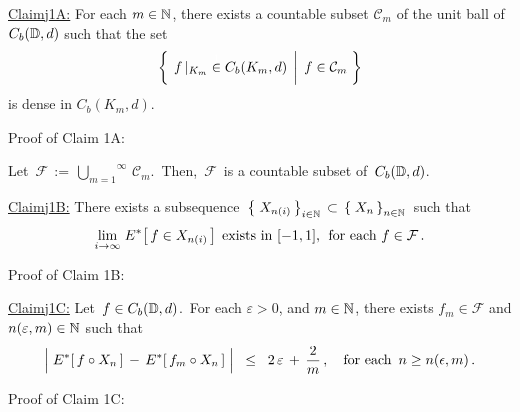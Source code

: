 \vskip 0.8cm
\begin{center}\begin{minipage}{6.5in}
\underline{Claim{{\color{white}j}}1A:}\;\;
For each $m \in \mathbb{N}$, there exists a countable subset $\mathcal{C}_{m}$
of the unit ball of $C_{b}(\mathbb{D},d)$ such that the set
\begin{equation*}
\left\{\;
	\left.
	f\,\vert_{K_{m}} \overset{{\color{white}1}}{\in} C_{b}(K_{m},d)
	\,\;\right\vert\;
	f \in \mathcal{C}_{m}
\;\right\}
\end{equation*}
is dense in $C_{b}(K_{m},d)$.
\end{minipage}\end{center}
Proof of Claim 1A:\;\;

\vskip 0.5cm
\noindent
Let \,$\mathcal{F} \,:=\, \overset{\infty}{\underset{m=1}{\bigcup}}\,\mathcal{C}_{m}$.\,
Then, \,$\mathcal{F}$\, is a countable subset of \,$C_{b}(\mathbb{D},d)$.\,

\vskip 0.8cm
\begin{center}\begin{minipage}{6.5in}
\underline{Claim{{\color{white}j}}1B:}\;\;
There exists a subsequence
\,$\left\{\;X_{n(i)}\,\right\}_{i\in\mathbb{N}} \,\subset\, \left\{\;X_{n}\,\right\}_{n\in\mathbb{N}}$\,
such that %
\begin{equation*}
\underset{i\rightarrow\infty}{\lim}\; E^{*}\!\left[\,f \in X_{n(i)}\,\right]
\;\textnormal{exists in $[-1,1]$, \;for each $f \in \mathcal{F}$}\,.
\end{equation*}
\end{minipage}\end{center}
Proof of Claim 1B:\;\;

\vskip 0.8cm
\begin{center}\begin{minipage}{6.5in}
\underline{Claim{{\color{white}j}}1C:}\;\;
Let \,$f \in C_{b}(\mathbb{D},d)$.\,
For each $\varepsilon > 0$, and $m \in \mathbb{N}$,
there exists $f_{m} \in \mathcal{F}$ and $n(\varepsilon,m) \in \mathbb{N}$ such that
\begin{equation*}
\left\vert\; \overset{{\color{white}.}}{E^{*}}[\,f \circ X_{n}\,] \,-\, E^{*}[\,f_{m} \circ X_{n}\,] \;\right\vert
\;\; \leq \;\;
	2\,\varepsilon \,+\, \dfrac{2}{m}\,,
\quad
\textnormal{for each \,$n \geq n(\epsilon,m)$}\,.
\end{equation*}
\end{minipage}\end{center}
Proof of Claim 1C:\;\;

